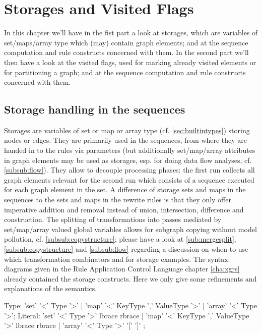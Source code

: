 \chapter{Storages and Visited Flags}
\label{cha:storagesvisited}

In this chapter we'll have in the fist part a look at storages,
which are variables of set/maps/array type which (may) contain graph elements;
and at the sequence computation and rule constructs concerned with them.
In the second part we'll then have a look at the visited flags, 
used for marking already visited elements or for partitioning a graph;
and at the sequence computation and rule constructs concerned with them.

\section{Storage handling in the sequences}\label{sec:storages}

Storages are variables of set or map or array type (cf. \ref{sec:builtintypes}) storing nodes or edges.
They are primarily used in the sequences, from where they are handed in to the rules via parameters
(but additionally set/map/array attributes in graph elements may be used as storages,
esp. for doing data flow analyses, cf. \ref{subsub:flow}).
They allow to decouple processing phases: the first run collects all graph elements relevant for the second run which consists of a sequence executed for each graph element in the set.
A difference of storage sets and maps in the sequences to the sets and maps in the rewrite rules is that they only offer imperative addition and removal instead of union, intersection, difference and construction.
The splitting of transformations into passes mediated by set/map/array valued global variables allows for subgraph copying without model pollution, cf. \ref{subsub:copystructure}; please have a look at \ref{sub:mergesplit}, \ref{subsub:copystructure} and \ref{subsub:flow} regarding a discussion on when to use which transformation combinators and for storage examples.
The syntax diagrams given in the Rule Application Control Language chapter \ref{cha:xgrs} already contained the storage constructs.
Here we only give some refinements and explanations of the semantics.

\begin{rail}
  Type: 'set' '<' Type '>'
    | 'map' '<' KeyType ',' ValueType '>'
    | 'array' '<' Type '>';
  Literal:
    'set' '<' Type '>' lbrace rbrace |
    'map' '<' KeyType ',' ValueType '>' lbrace rbrace |
    'array' '<' Type '>' '[' ']'
	;
\end{rail}%

